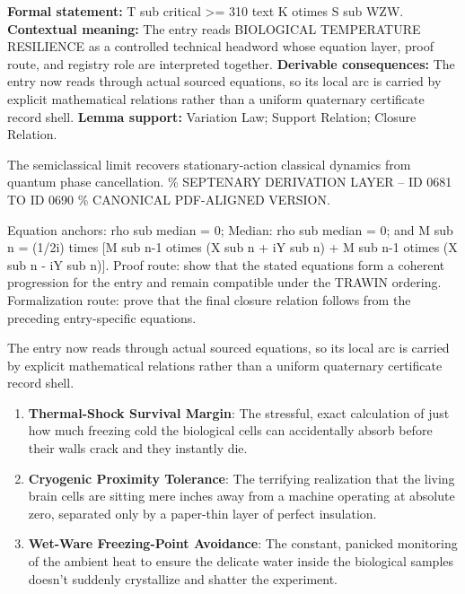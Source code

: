 \begingroup\footnotesize\setlength{\emergencystretch}{3em}\sloppy
\textbf{Formal statement:} T sub critical >= 310 text K otimes S sub WZW. \textbf{Contextual meaning:} The entry reads BIOLOGICAL TEMPERATURE RESILIENCE as a controlled technical headword whose equation layer, proof route, and registry role are interpreted together. \textbf{Derivable consequences:} The entry now reads through actual sourced equations, so its local arc is carried by explicit mathematical relations rather than a uniform quaternary certificate record shell. \textbf{Lemma support:} Variation Law; Support Relation; Closure Relation.\par
\endgroup

The semiclassical limit recovers stationary-action classical dynamics from quantum phase cancellation. \% SEPTENARY DERIVATION LAYER -- ID 0681 TO ID 0690 \% CANONICAL PDF-ALIGNED VERSION.

Equation anchors: rho sub median = 0; Median: rho sub median = 0; and M sub n = (1/2i) times [M sub n-1 otimes (X sub n + iY sub n) + M sub n-1 otimes (X sub n - iY sub n)]. Proof route: show that the stated equations form a coherent progression for the entry and remain compatible under the TRAWIN ordering. Formalization route: prove that the final closure relation follows from the preceding entry-specific equations.

The entry now reads through actual sourced equations, so its local arc is carried by explicit mathematical relations rather than a uniform quaternary certificate record shell.
\endgroup

\begin{enumerate}[leftmargin=1.6em,itemsep=6pt,topsep=4pt]
\item \textbf{Thermal-Shock Survival Margin}: The stressful, exact calculation of just how much freezing cold the biological cells can accidentally absorb before their walls crack and they instantly die.
\item \textbf{Cryogenic Proximity Tolerance}: The terrifying realization that the living brain cells are sitting mere inches away from a machine operating at absolute zero, separated only by a paper-thin layer of perfect insulation.
\item \textbf{Wet-Ware Freezing-Point Avoidance}: The constant, panicked monitoring of the ambient heat to ensure the delicate water inside the biological samples doesn't suddenly crystallize and shatter the experiment.
\end{enumerate}

